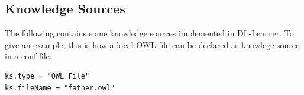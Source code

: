\documentclass[a4paper,12pt]{scrartcl}
\begin{document}
\subsection{Knowledge Sources}

The following contains some knowledge sources implemented in DL-Learner. To give an example, this is how a local OWL file can be declared as knowlege source in a conf file:
\begin{verbatim}
ks.type = "OWL File"
ks.fileName = "father.owl"
\end{verbatim}
\end{document}
